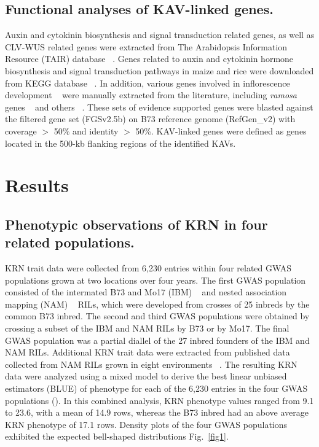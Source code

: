\documentclass[10pt,letterpaper]{article}
\begin{document}
\subsection*{Functional analyses of KAV-linked genes.} 
Auxin and cytokinin biosynthesis and signal transduction related genes, as well as CLV-WUS related genes were extracted from The Arabidopsis Information Resource (TAIR) database ~\cite{Poole2007}. Genes related to auxin and cytokinin hormone biosynthesis and signal transduction pathways in maize and rice were downloaded from KEGG database ~\cite{Kanehisa2002}. In addition, various genes involved in inflorescence development ~\cite{Barazesh2008} were manually extracted from the literature, including \emph{ramosa} genes ~\cite{Bortiri2006} and others ~\cite{McSteen2001, Upadyayula2006, Xu2011}. These sets of evidence supported genes were blasted against the filtered gene set (FGSv2.5b) on B73 reference genome (RefGen\_v2) with coverage $>$ 50\% and identity $>$ 50\%. KAV-linked genes were defined as genes located in the 500-kb flanking regions of the identified KAVs.


\section*{Results}
\subsection*{Phenotypic observations of KRN in four related populations.}

KRN trait data were collected from 6,230 entries within four related GWAS populations grown at two locations over four years. The first GWAS population consisted of the intermated B73 and Mo17 (IBM) ~\cite{Lee2002} and nested association mapping (NAM) ~\cite{Yu2008} RILs, which were developed from crosses of 25 inbreds by the common B73 inbred. The second and third GWAS populations were obtained by crossing a subset of the IBM and NAM RILs by B73 or by Mo17.  The final GWAS population was a partial diallel of the 27 inbred founders of the IBM and NAM RILs. Additional KRN trait data were extracted from published data collected from NAM RILs grown in eight environments ~\cite{Brown2011}. The resulting KRN data were analyzed using a mixed model to derive the best linear unbiased estimators (BLUE) of phenotype for each of the 6,230 entries in the four GWAS populations (). In this combined analysis, KRN phenotype values ranged from 9.1 to 23.6, with a mean of 14.9 rows, whereas the B73 inbred had an above average KRN phenotype of 17.1 rows. Density plots of the four GWAS populations exhibited the expected bell-shaped distributions Fig.~\ref{fig1}.
\end{document}
